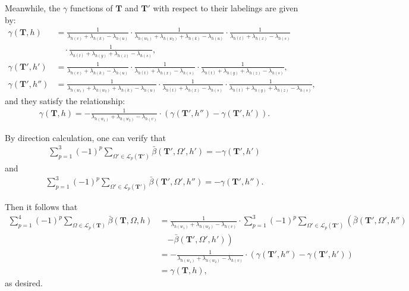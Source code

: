 \documentclass[superscriptaddress,onecolumn,nofootinbib,longbibliography,a4paper,accepted=2026-09-29]{quantumarticle}
\theoremstyle{plain}
\theoremstyle{definition}
\numberwithin{thm}{section}
\numberwithin{assumption}{section}
\numberwithin{lemma}{section}
\numberwithin{prop}{section}
\numberwithin{cor}{section}
\numberwithin{definition}{section}
\numberwithin{rmk}{section}
\numberwithin{equation}{section}
\newcommand{\lrb}[1]{\left ( #1 \right )}
\newcommand{\mbf}{\mathbf{T}}
\begin{document}
\begin{itemize}
Meanwhile, the $\gamma$ functions of $\mbf$ and $\mbf'$ with respect to their labelings are given by:
\begin{align}
\gamma(\mbf, h) &=
\frac{1}{\lambda_{h(v)}+\lambda_{h(k)}-\lambda_{h(u)}}
\cdot \frac{1}{\lambda_{h(w_1)}+\lambda_{h(w_2)}+\lambda_{h(k)}-\lambda_{h(u)}} \cdot 
\frac{1}{\lambda_{h(t)}+\lambda_{h(x)}-\lambda_{h(s)}} \nonumber\\ &\quad \cdot
\frac{1}{\lambda_{h(t)}+\lambda_{h(y)}+\lambda_{h(z)}-
\lambda_{h(s)}}, \\
    \gamma(\mbf', h')&= \frac{1}{\lambda_{h(v)}+\lambda_{h(k)}-\lambda_{h(u)}} \cdot 
\frac{1}{\lambda_{h(t)}+\lambda_{h(x)}-\lambda_{h(s)}} \cdot
\frac{1}{\lambda_{h(t)}+\lambda_{h(y)}+\lambda_{h(z)}-
\lambda_{h(s)}}, \\
\gamma(\mbf', h'')&= \frac{1}{\lambda_{h(w_1)}+\lambda_{h(w_2)}+\lambda_{h(k)}-\lambda_{h(u)}} \cdot 
\frac{1}{\lambda_{h(t)}+\lambda_{h(x)}-\lambda_{h(s)}} \cdot
\frac{1}{\lambda_{h(t)}+\lambda_{h(y)}+\lambda_{h(z)}-
\lambda_{h(s)}},
\end{align}
and they satisfy the relationship:
\begin{align}
\gamma(\mbf, h) = -\frac{1}{\lambda_{h(w_1)}+\lambda_{h(w_2)}-\lambda_{h(v)} } \cdot \lrb{\gamma(\mbf', h'')-\gamma(\mbf', h')}.
\end{align}

By direction calculation, one can verify that
\begin{align}
\sum_{p=1}^{3} (-1)^p
\sum_{\Omega' \in \mathcal{L}_{p}(\mbf')} 
\bar{\beta}(\mbf', \Omega', h')
= -\gamma(\mbf', h')
\end{align}
and
\begin{align}
\sum_{p=1}^{3} (-1)^p
\sum_{\Omega' \in \mathcal{L}_{p}(\mbf')} 
\bar{\beta}(\mbf', \Omega', h'')
= - \gamma(\mbf', h'').
\end{align}

Then it follows that
\begin{align}
\sum_{p=1}^{4} (-1)^p
\sum_{\Omega \in \mathcal{L}_{p}(\mbf)} 
\bar{\beta}(\mbf, \Omega, h)  
&=\frac{1}{\lambda_{h(w_1)}+\lambda_{h(w_2)}-\lambda_{h(v)}} \cdot
\sum_{p=1}^{3} (-1)^p
\sum_{\Omega' \in \mathcal{L}_{p}(\mbf')} 
\left (\bar{\beta}(\mbf', \Omega', h'') \right . \\
&\quad \left . -\bar{\beta}(\mbf', \Omega', h')\right )
\\
&=-\frac{1}{\lambda_{h(w_1)}+\lambda_{h(w_2)}-\lambda_{h(v)}} \cdot \lrb{\gamma(\mbf', h'')-\gamma(\mbf',h')} \\
&=\gamma(\mbf, h),
\end{align}
as desired.
\end{itemize}
\end{document}
